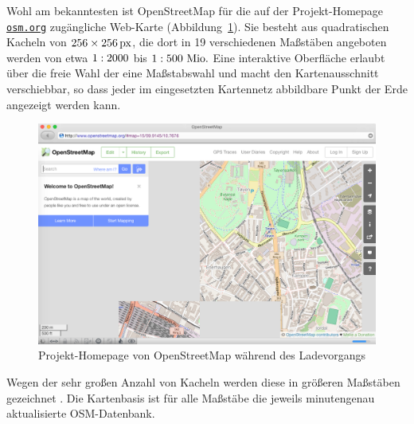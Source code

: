 \documentclass[../main/thesis.tex]{subfiles}
\begin{document}
Wohl am bekanntesten ist OpenStreetMap für die auf der Projekt-Homepage \href{https://www.openstreetmap.org/}{\nolinkurl{osm.org}} zugängliche Web-Karte (Abbildung~\ref{fig:osm.org}).
Sie besteht aus quadratischen Kacheln  von $256\times\unit[256]{px}$, die dort in 19 verschiedenen Maßstäben angeboten werden von etwa $1 \nobreak : \nobreak 2000$ bis $1 \nobreak : \nobreak 500~\unit{Mio.}$ 
Eine interaktive Oberfläche erlaubt über die freie Wahl der  eine Maßstabswahl und macht den Kartenausschnitt verschiebbar, so dass jeder im eingesetzten Kartennetz abbildbare Punkt der Erde angezeigt werden kann.


\begin{figure}[ht]
    \centering
    \includegraphics[width=\ScaleIfNeeded]{../chapter2/osm-org}
    \caption{Projekt-Homepage von OpenStreetMap während des Ladevorgangs}\label{fig:osm.org}
\end{figure}

Wegen der sehr großen Anzahl von Kacheln werden diese in größeren Maßstäben  gezeichnet .
Die Kartenbasis ist für alle Maßstäbe die jeweils minutengenau aktualisierte OSM-Datenbank. \noref %
\end{document}
